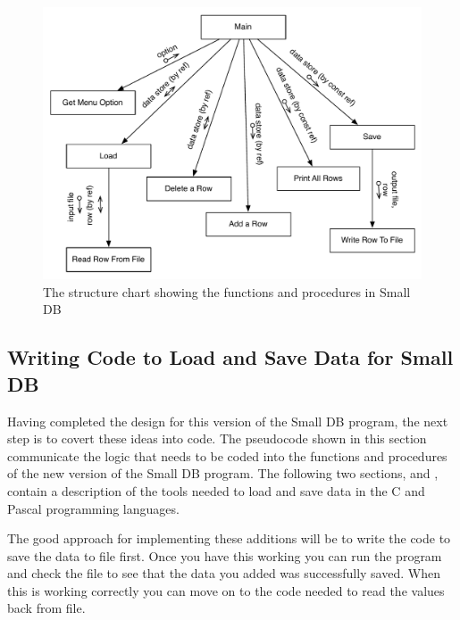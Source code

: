 \begin{figure}[h]
   \centering
   \includegraphics[width=\textwidth]{./topics/file-io/diagrams/SmallDB3Structure} 
   \caption{The structure chart showing the functions and procedures in Small DB}
   \label{fig:small_db_3_struct}
\end{figure}



\subsection{Writing Code to Load and Save Data for Small DB} %
\label{sub:writing_code_to_load_and_save_data_for_small_db}

Having completed the design for this version of the Small DB program, the next step is to covert these ideas into code. The pseudocode shown in this section communicate the logic that needs to be coded into the functions and procedures of the new version of the Small DB program. The following two sections,   and   , contain a description of the tools needed to load and save data in the C and Pascal programming languages.

The good approach for implementing these additions will be to write the code to save the data to file first. Once you have this working you can run the program and check the file to see that the data you added was successfully saved. When this is working correctly you can move on to the code needed to read the values back from file. 

